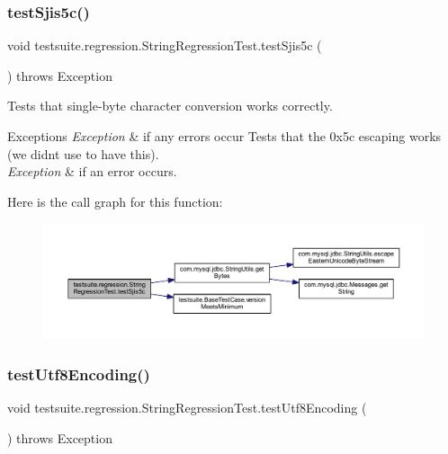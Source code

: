 \subsubsection{\texorpdfstring{test\+Sjis5c()}{testSjis5c()}}
{\footnotesize\ttfamily void testsuite.\+regression.\+String\+Regression\+Test.\+test\+Sjis5c (\begin{DoxyParamCaption}{ }\end{DoxyParamCaption}) throws Exception}

Tests that single-\/byte character conversion works correctly.


\begin{DoxyExceptions}{Exceptions}
{\em Exception} & if any errors occur Tests that the 0x5c escaping works (we didn\textquotesingle{}t use to have this).\\
\hline
{\em Exception} & if an error occurs. \\
\hline
\end{DoxyExceptions}
Here is the call graph for this function\+:
\nopagebreak
\begin{figure}[H]
\begin{center}
\leavevmode
\includegraphics[width=350pt]{classtestsuite_1_1regression_1_1_string_regression_test_a79556638c7ab71bef596c339006c2e19_cgraph}
\end{center}
\end{figure}
\mbox{\label{classtestsuite_1_1regression_1_1_string_regression_test_a4f3f125a39d60c4abe46d69db6002ede}} 
\subsubsection{\texorpdfstring{test\+Utf8\+Encoding()}{testUtf8Encoding()}}
{\footnotesize\ttfamily void testsuite.\+regression.\+String\+Regression\+Test.\+test\+Utf8\+Encoding (\begin{DoxyParamCaption}{ }\end{DoxyParamCaption}) throws Exception}


